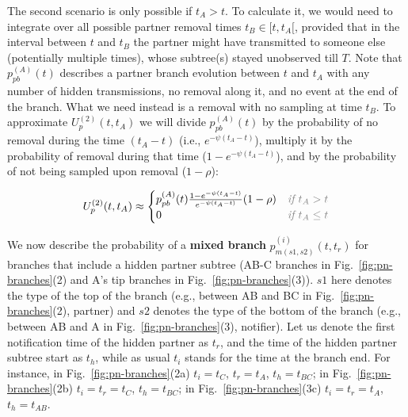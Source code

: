 \documentclass[10pt,letterpaper]{article}
\begin{document}
The second scenario is only possible if $t_A > t$. To calculate it, we would need to integrate over all possible partner removal times $t_B \in [t, t_A[$, provided that in the interval between $t$ and $t_B$ the partner might have transmitted to someone else (potentially multiple times), whose subtree(s) stayed unobserved till $T$. Note that $p_{pb}^{(A)}(t)$ describes a partner branch evolution between $t$ and $t_A$ with any number of hidden transmissions, no removal along it, and no event at the end of the branch. What we need instead is a removal with no sampling at time $t_B$. To approximate $U_p^{(2)}(t, t_A)$ we will divide $p_{pb}^{(A)}(t)$ by the probability of no removal during the time $(t_A - t)$ (i.e., $e^{-\psi(t_A - t)}$), multiply it by the probability of removal during that time ($1 - e^{-\psi(t_A - t)}$), and by the probability of not being sampled upon removal ($1 - \rho$):

\begin{equation}
U_p^{(2)}(t, t_A) \approx 
\begin{cases}
p_{pb}^{(A)}(t) \frac{1 - e^{-\psi(t_A - t)}}{e^{-\psi(t_A - t)}} (1 - \rho)& \textit{\color{gray} if $t_A > t$}\\
0 & \textit{\color{gray} if $t_A \leq t$}
\end{cases}
\end{equation}





We now describe the probability of a\textbf{ mixed branch} $p_{m(s1,s2)}^{(i)}(t,t_r)$ for branches that include a hidden partner subtree (AB-C branches in Fig.~\ref{fig:pn-branches}(2) and A's tip branches in Fig.~\ref{fig:pn-branches}(3)). $s1$ here denotes the type of the top of the branch (e.g., between AB and BC in Fig.~\ref{fig:pn-branches}(2), partner) and $s2$ denotes the type of the bottom of the branch (e.g., between AB and A in Fig.~\ref{fig:pn-branches}(3), notifier). Let us denote the first notification time of the hidden partner as $t_r$, and the time of the hidden partner subtree start as $t_h$, while as usual $t_i$ stands for the time at the branch end.  For instance, in Fig.~\ref{fig:pn-branches}(2a) $t_i=t_C$, $t_r=t_A$, $t_h=t_{BC}$; in Fig.~\ref{fig:pn-branches}(2b) $t_i=t_r=t_C$, $t_h=t_{BC}$; in Fig.~\ref{fig:pn-branches}(3c) $t_i=t_r=t_A$, $t_h=t_{AB}$. 
\end{document}
